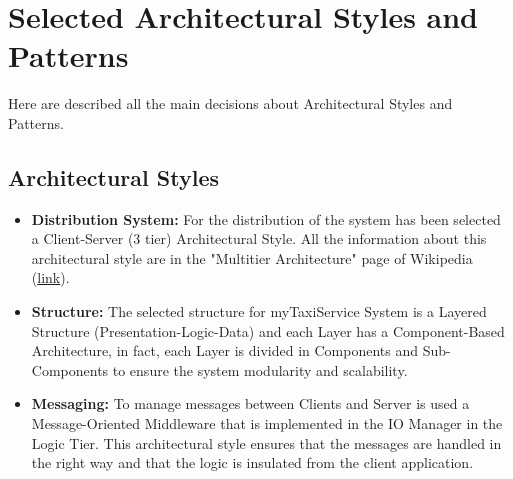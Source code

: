 \documentclass[../../../../dd.tex]{subfiles}
\begin{document}
	\section{Selected Architectural Styles and Patterns}
		Here are described all the main decisions about Architectural Styles and Patterns.
		\subsection{Architectural Styles}
			
			\begin{itemize}
				\item \textbf{Distribution System:} For the distribution of the system has been selected a Client-Server (3 tier) Architectural Style. All the information about this architectural style are in the "Multitier Architecture" page of Wikipedia (\href{https://en.wikipedia.org/wiki/Multitier_architecture#Three-tier_architecture}{link}).
				
				\item \textbf{Structure:} The selected structure for myTaxiService System is a Layered Structure (Presentation-Logic-Data) and each Layer has a Component-Based Architecture, in fact, each Layer is divided in Components and Sub-Components to ensure the system modularity and scalability.

				\item \textbf{Messaging:} To manage messages between Clients and Server is used a Message-Oriented Middleware that is implemented in the IO Manager in the Logic Tier. This architectural style ensures that the messages are handled in the right way and that the logic is insulated from the client application.

			\end{itemize}
\end{document}
